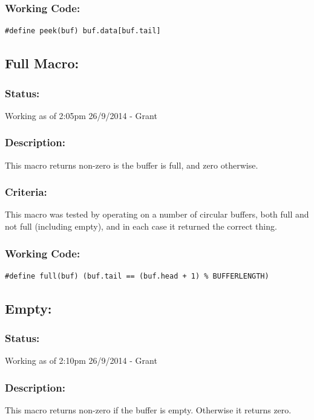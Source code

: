\documentclass[]{report}
\begin{document}
\subsubsection{Working Code:}
\begin{lstlisting}
#define peek(buf) buf.data[buf.tail]
\end{lstlisting}

\subsection{Full Macro:}
\subsubsection{Status:}
Working as of 2:05pm 26/9/2014 - Grant

\subsubsection{Description:}
This macro returns non-zero is the buffer is full, and zero otherwise.

\subsubsection{Criteria:}
This macro was tested by operating on a number of circular buffers, both full and not full (including empty), and in each case it returned the correct thing.

\subsubsection{Working Code:}
\begin{lstlisting}
#define full(buf) (buf.tail == (buf.head + 1) % BUFFERLENGTH)
\end{lstlisting}

\subsection{Empty:}
\subsubsection{Status:}
Working as of 2:10pm 26/9/2014 - Grant

\subsubsection{Description:}
This macro returns non-zero if the buffer is empty. Otherwise it returns zero.
\end{document}
